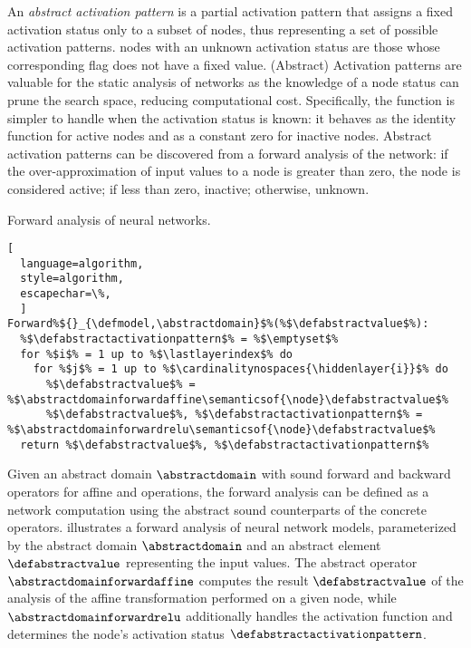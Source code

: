 An \emph{abstract activation pattern} is a partial activation pattern that assigns a fixed activation status only to a subset of \relu{} nodes, thus representing a set of possible activation patterns. \relu{} nodes with an unknown activation status are those whose corresponding flag does not have a fixed value. (Abstract) Activation patterns are valuable for the static analysis of networks as the knowledge of a node status can prune the search space, reducing computational cost. Specifically, the \relu{} function is simpler to handle when the activation status is known: it behaves as the identity function for active nodes and as a constant zero for inactive nodes. Abstract activation patterns can be discovered from a forward analysis of the network: if the over-approximation of input values to a node is greater than zero, the node is considered active; if less than zero, inactive; otherwise, unknown.


\begin{marginalgorithm}
  \caption{Forward analysis of neural networks.}
\begin{lstlisting}[
  language=algorithm,
  style=algorithm,
  escapechar=\%,
  ]
Forward%${}_{\defmodel,\abstractdomain}$%(%$\defabstractvalue$%):
  %$\defabstractactivationpattern$% = %$\emptyset$%
  for %$i$% = 1 up to %$\lastlayerindex$% do
    for %$j$% = 1 up to %$\cardinalitynospaces{\hiddenlayer{i}}$% do
      %$\defabstractvalue$% = %$\abstractdomainforwardaffine\semanticsof{\node}\defabstractvalue$%
      %$\defabstractvalue$%, %$\defabstractactivationpattern$% = %$\abstractdomainforwardrelu\semanticsof{\node}\defabstractvalue$%
  return %$\defabstractvalue$%, %$\defabstractactivationpattern$%
\end{lstlisting}
\end{marginalgorithm}



Given an abstract domain $\abstractdomain$ with sound forward and backward operators for affine and \relu{} operations, the forward analysis can be defined as a network computation using the abstract sound counterparts of the concrete operators.  illustrates a forward analysis of neural network models, parameterized by the abstract domain $\abstractdomain$ and an abstract element $\defabstractvalue$ representing the input values. The abstract operator $\abstractdomainforwardaffine$ computes the result $\defabstractvalue$ of the analysis of the
affine transformation performed on a given node, while $\abstractdomainforwardrelu$ additionally handles the \relu{} activation function and determines the node's activation status $\defabstractactivationpattern$.

